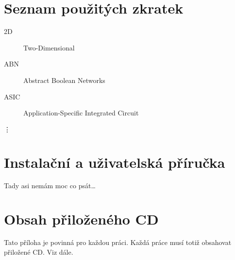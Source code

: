 \documentclass[11pt,twoside,a4paper]{book}
\begin{document}
%




%
\def\CS{$\cal C\kern-0.1667em\lower.5ex\hbox{$\cal S$}\kern-0.075em $}


%

\appendix

\chapter{Seznam použitých zkratek}

\begin{description}
\item[2D] Two-Dimensional
\item[ABN] Abstract Boolean Networks
\item[ASIC] Application-Specific Integrated Circuit
\end{description}
\vdots


\chapter{Instalační a uživatelská příručka}
Tady asi nemám moc co psát\ldots


\chapter{Obsah přiloženého CD}
\label{chap:CD}
Tato příloha je povinná pro každou práci. Každá práce musí totiž obsahovat přiložené CD. Viz dále.
\end{document}
